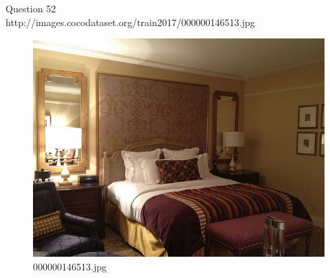Question 52\\
http://images.cocodataset.org/train2017/000000146513.jpg
\begin{figure}[h]
    \centering
    \includegraphics[width=0.8\linewidth]{../image set/hard/000000146513.jpg}
    \caption{000000146513.jpg}
\end{figure}
